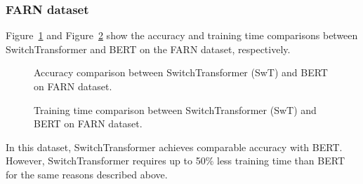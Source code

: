 \subsubsection{FARN dataset}
Figure~\ref{fig:accuracy_comparison_farn} and Figure~\ref{fig:trainingTime_comparison_farn} show the accuracy and training time comparisons between SwitchTransformer and BERT on the FARN dataset, respectively.
\begin{figure}[h]
  \centering
 \hfill
  \caption{Accuracy comparison between SwitchTransformer (SwT) and BERT on FARN dataset.}
  \label{fig:accuracy_comparison_farn}
\end{figure}
\begin{figure}[h]
  \centering
 \hfill
  \caption{Training time comparison between SwitchTransformer (SwT) and BERT on FARN dataset.}
  \label{fig:trainingTime_comparison_farn}
\end{figure}
In this dataset, SwitchTransformer achieves comparable accuracy with BERT. However, SwitchTransformer requires up to 50\% less training time than BERT for the same reasons described above.

